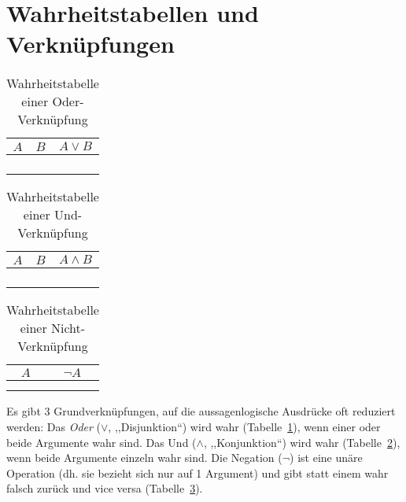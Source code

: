 \section{Wahrheitstabellen und Verknüpfungen}
%
\begin{table}[p]
 \begin{center}
  \begin{tabular}{cc|c}
   \hline
    $A$ & $B$ & $A \lor B$ \\
   \hline \hline
    \F  & \F  & \F \\
    \F  & \T  & \T \\
    \T  & \F  & \T \\
    \T  & \T  & \T \\
  \end{tabular}
  \caption{Wahrheitstabelle einer Oder-Verknüpfung}
  \label{fig:or_operator}
 \end{center}
\end{table}
\begin{table}[p]
 \begin{center}
  \begin{tabular}{cc|c}
   \hline
    $A$ & $B$ & $A \land B$ \\
   \hline \hline
    \F  & \F  & \F \\
    \F  & \T  & \F \\
    \T  & \F  & \F \\
    \T  & \T  & \T \\
  \end{tabular}
  \caption{Wahrheitstabelle einer Und-Verknüpfung}
  \label{fig:and_operator}
 \end{center}
\end{table}
\begin{table}[p]
 \begin{center}
  \begin{tabular}{c|c}
   \hline
    $A$ & $\neg A$ \\
   \hline \hline
    \F   & \T \\
    \T   & \F \\
  \end{tabular}
  \caption{Wahrheitstabelle einer Nicht-Verknüpfung}
  \label{fig:neg_operator}
 \end{center}
\end{table}
%
Es gibt 3 Grundverknüpfungen, auf die aussagenlogische Ausdrücke oft reduziert werden: Das \emph{Oder} ($\lor$, ,,Disjunktion``) wird wahr (Tabelle~\ref{fig:or_operator}), wenn einer oder beide Argumente wahr sind. Das Und ($\land$, ,,Konjunktion``) wird wahr (Tabelle~\ref{fig:and_operator}), wenn beide Argumente einzeln wahr sind. Die Negation ($\neg$) ist eine unäre Operation (dh. sie bezieht sich nur auf 1 Argument) und gibt statt einem wahr falsch zurück und vice versa (Tabelle~\ref{fig:neg_operator}).

